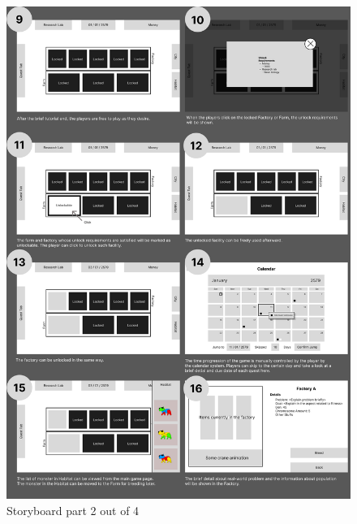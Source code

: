 \documentclass[12pt,oneside,openright,a4paper]{cpe-english-project}
\begin{document}
\newpage
\begin{figure}[!h]\centering \includegraphics[width=14cm]{appendix-a-figure/storyboard2.png} \caption{Storyboard part 2 out of 4} \end{figure}
\newpage
\end{document}
